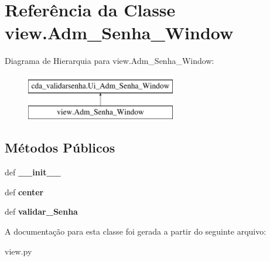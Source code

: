 \hypertarget{classview_1_1Adm__Senha__Window}{\section{\-Referência da \-Classe view.\-Adm\-\_\-\-Senha\-\_\-\-Window}
\label{classview_1_1Adm__Senha__Window}
}
\-Diagrama de \-Hierarquia para view.\-Adm\-\_\-\-Senha\-\_\-\-Window\-:\begin{figure}[H]
\begin{center}
\leavevmode
\includegraphics[height=2.000000cm]{classview_1_1Adm__Senha__Window}
\end{center}
\end{figure}
\subsection*{\-Métodos \-Públicos}
\begin{DoxyCompactItemize}
\item 
\hypertarget{classview_1_1Adm__Senha__Window_a4cf8d3f5a9f0703cf1ba808b30c3a42a}{def {\bfseries \-\_\-\-\_\-init\-\_\-\-\_\-}}\label{classview_1_1Adm__Senha__Window_a4cf8d3f5a9f0703cf1ba808b30c3a42a}

\item 
\hypertarget{classview_1_1Adm__Senha__Window_af72de01c1e431a652bf4477016d60a69}{def {\bfseries center}}\label{classview_1_1Adm__Senha__Window_af72de01c1e431a652bf4477016d60a69}

\item 
\hypertarget{classview_1_1Adm__Senha__Window_a300db6a54bea629b5f57d68e767766f9}{def {\bfseries validar\-\_\-\-Senha}}\label{classview_1_1Adm__Senha__Window_a300db6a54bea629b5f57d68e767766f9}

\end{DoxyCompactItemize}


\-A documentação para esta classe foi gerada a partir do seguinte arquivo\-:\begin{DoxyCompactItemize}
\item 
view.\-py\end{DoxyCompactItemize}
